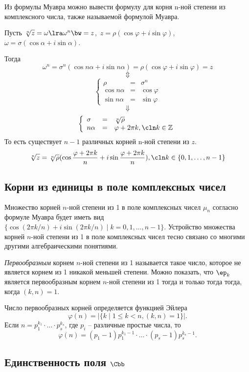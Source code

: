Из формулы Муавра можно вывести формулу для корня n-ной степени из комплексного числа, также называемой формулой Муавра.

Пусть 
$\sqrt[n]{z} = \omega \lra \omega^n\bw=z$,\  $z=\rho(\cos\varphi+i\sin\varphi)$,\ $\omega=\sigma(\cos\alpha+i\sin\alpha)$.

Тогда
$$\omega^n=\sigma^n(\cos n\alpha+i\sin n\alpha)=\rho(\cos\varphi+i\sin\varphi)=z$$
$$\Updownarrow$$
$$
 \left\{
  \begin{array}{lcl}
   \rho&=&\sigma^n\\
   \cos n\alpha&=&\cos\varphi\\
   \sin n\alpha&=&\sin\varphi
  \end{array}
 \right.
$$ 
$$\Downarrow$$
$$
 \left\{
  \begin{array}{lcl}
   \sigma&=&\sqrt[n]{\rho}\\
   n\alpha&=&\varphi+2\pi k,\cln k\in\mathbb Z
  \end{array}
 \right.
$$
То есть существует $n-1$ различных корней n-ной степени из $z$.
$$\sqrt[n]{z}=\sqrt[n]{\rho}(\cos \frac{\varphi+2\pi k}{n}+i\sin \frac{\varphi+2\pi k}{n}),\cln k\in\{0,1,\dots ,n-1\} $$

\subsection{Корни из единицы в поле комплексных чисел}

Множество корней $n$-ной степени из 1 в поле комплексных чисел $\mu_n$ согласно формуле Муавра будет иметь вид $\{\cos(2\pi k/n)+i\sin(2\pi k/n)\mid k=0,1,\dots,n-1\}$. Устройство множества корней $n$-ной степени из 1 в поле комплексных чисел тесно связано со многими другими алгебраическими понятиями.

\begin{df}
  \emph{Первообразным} корнем $n$-ной степени из 1 называется такое число, которое не является корнем из 1 никакой меньшей степени. Можно показать, что $\ep_k$ является первообразным корнем $n$-ной степени из 1 тогда и только тогда тогда, когда $(k,n)=1$.
  
  Число первообразных корней определяется функцией Эйлера $$\varphi(n)=|\{k\mid 1\le k<n, (k,n)=1\}|.$$ Если $n=p_1^{k_1}\cdot\dots\cdot p_s^{k_s}$, где $p_i$ -- различные простые числа, то $$\varphi(n)=(p_1-1)p_1^{k_1-1}\cdot\dots\cdot (p_s-1)p_s^{k_s-1}.$$
\end{df}

\subsection{Единственность поля $\Cbb$}

